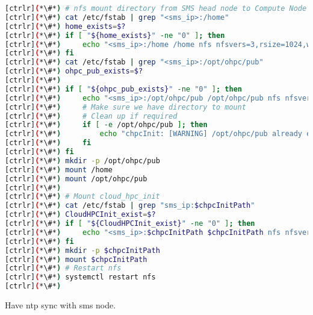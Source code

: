 \begin{lstlisting}[language=bash,keywords={}]
[ctrlr](*\#*) # nfs mount directory from SMS head node to Compute Node
[ctrlr](*\#*) cat /etc/fstab | grep "<sms_ip>:/home"
[ctrlr](*\#*) home_exists=$?
[ctrlr](*\#*) if [ "${home_exists}" -ne "0" ]; then
[ctrlr](*\#*)     echo "<sms_ip>:/home /home nfs nfsvers=3,rsize=1024,wsize=1024,cto 0 [ctrlr](*\#*) 0" >> /etc/fstab
[ctrlr](*\#*) fi
[ctrlr](*\#*) cat /etc/fstab | grep "<sms_ip>:/opt/ohpc/pub"
[ctrlr](*\#*) ohpc_pub_exists=$?
[ctrlr](*\#*) 
[ctrlr](*\#*) if [ "${ohpc_pub_exists}" -ne "0" ]; then
[ctrlr](*\#*)     echo "<sms_ip>:/opt/ohpc/pub /opt/ohpc/pub nfs nfsvers=3 0 0" >> /etc/fstab
[ctrlr](*\#*)     # Make sure we have directory to mount
[ctrlr](*\#*)     # Clean up if required
[ctrlr](*\#*)     if [ -e /opt/ohpc/pub ]; then
[ctrlr](*\#*)         echo "chpcInit: [WARNING] /opt/ohpc/pub already exists!!"
[ctrlr](*\#*)     fi
[ctrlr](*\#*) fi
[ctrlr](*\#*) mkdir -p /opt/ohpc/pub
[ctrlr](*\#*) mount /home
[ctrlr](*\#*) mount /opt/ohpc/pub
[ctrlr](*\#*) 
[ctrlr](*\#*) # Mount cloud_hpc_init
[ctrlr](*\#*) cat /etc/fstab | grep "sms_ip:$chpcInitPath"
[ctrlr](*\#*) CloudHPCInit_exist=$?
[ctrlr](*\#*) if [ "${CloudHPCInit_exist}" -ne "0" ]; then
[ctrlr](*\#*)     echo "<sms_ip>:$chpcInitPath $chpcInitPath nfs nfsvers=3 0 0" >> /etc/fstab
[ctrlr](*\#*) fi
[ctrlr](*\#*) mkdir -p $chpcInitPath
[ctrlr](*\#*) mount $chpcInitPath
[ctrlr](*\#*) # Restart nfs
[ctrlr](*\#*) systemctl restart nfs
[ctrlr](*\#*) 
\end{lstlisting}

Have ntp sync with sms node. 


